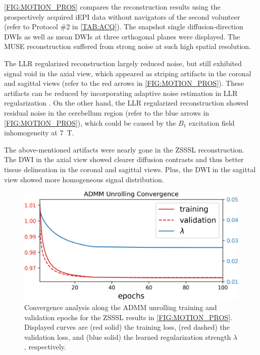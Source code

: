 \documentclass[journal,twoside,web]{ieeecolor}
\begin{document}
	\cref{FIG:MOTION_PROS} compares the reconstruction results
	using the prospectively acquired iEPI data without navigators 
	of the second volunteer 
	(refer to Protocol \#2 in \cref{TAB:ACQ}).
	The snapshot single diffusion-direction DWIs 
	as well as mean DWIs 
	at three orthogonal planes were displayed.
	The MUSE reconstruction suffered from strong noise 
	at such high spatial resolution.
	
	The LLR regularized reconstruction largely reduced noise,
	but still exhibited signal void in the axial view, 
	which appeared as striping artifacts in the coronal and sagittal views 
	(refer to the red arrows in \cref{FIG:MOTION_PROS}).
	These artifacts can be reduced by incorporating adaptive noise estimation 
	in LLR regularization \cite{cordero_2019_cplxdwi}. 
	On the other hand, the LLR regularized reconstruction 
	showed residual noise in the cerebellum region
	(refer to the blue arrows in \cref{FIG:MOTION_PROS}), 
	which could be caused by the $B_1$ excitation field inhomogeneity 
	at \SI{7}{\tesla}. 
	
	The above-mentioned artifacts were nearly gone in the ZSSSL reconstruction.
	The DWI in the axial view showed clearer diffusion contrasts 
	and thus better tissue delineation in the coronal and sagittal views. 
	Plus, the DWI in the sagittal view showed more homogeneous 
	signal distribution.
	
	\begin{figure}
		\centering
		\includegraphics[width=\columnwidth]{../figures/fig5.png}
		\caption{Convergence analysis along the ADMM unrolling training 
			and validation epochs
			for the ZSSSL results in \cref{FIG:MOTION_PROS}.
			Displayed curves are (red solid) the training loss,
			(red dashed) the validation loss,
			and (blue solid) the learned regularization strength $\lambda$, respectively.}
		\label{FIG:CONVERGENCE}
	\end{figure}
	
\end{document}
